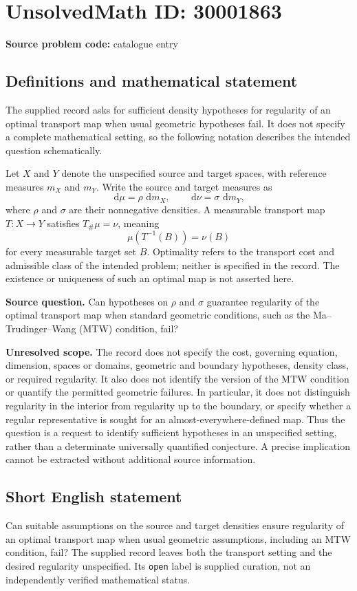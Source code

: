 \documentclass[11pt]{article}
\newcommand{\dd}{\,\mathrm{d}}
\begin{document}
\section*{UnsolvedMath ID: 30001863}
\textbf{Source problem code:} catalogue entry
\subsection{Definitions and mathematical statement}
The supplied record asks for sufficient density hypotheses for regularity of an optimal transport map when usual geometric hypotheses fail. It does not specify a complete mathematical setting, so the following notation describes the intended question schematically.

Let \(X\) and \(Y\) denote the unspecified source and target spaces, with reference measures \(m_X\) and \(m_Y\). Write the source and target measures as
\[
\dd\mu=\rho\,\dd m_X,\qquad \dd\nu=\sigma\,\dd m_Y,
\]
where \(\rho\) and \(\sigma\) are their nonnegative densities. A measurable transport map \(T:X\to Y\) satisfies \(T_{\#}\mu=\nu\), meaning
\[
\mu(T^{-1}(B))=\nu(B)
\]
for every measurable target set \(B\). Optimality refers to the transport cost and admissible class of the intended problem; neither is specified in the record. The existence or uniqueness of such an optimal map is not asserted here.

\textbf{Source question.} Can hypotheses on \(\rho\) and \(\sigma\) guarantee regularity of the optimal transport map when standard geometric conditions, such as the Ma--Trudinger--Wang (MTW) condition, fail?

\textbf{Unresolved scope.} The record does not specify the cost, governing equation, dimension, spaces or domains, geometric and boundary hypotheses, density class, or required regularity. It also does not identify the version of the MTW condition or quantify the permitted geometric failures. In particular, it does not distinguish regularity in the interior from regularity up to the boundary, or specify whether a regular representative is sought for an almost-everywhere-defined map. Thus the question is a request to identify sufficient hypotheses in an unspecified setting, rather than a determinate universally quantified conjecture. A precise implication cannot be extracted without additional source information.
\subsection{Short English statement}
Can suitable assumptions on the source and target densities ensure regularity of an optimal transport map when usual geometric assumptions, including an MTW condition, fail? The supplied record leaves both the transport setting and the desired regularity unspecified. Its \texttt{open} label is supplied curation, not an independently verified mathematical status.
\end{document}
